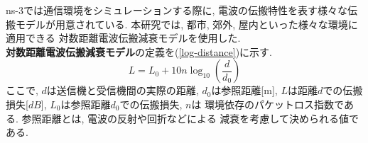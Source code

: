 \indent ns-3では通信環境をシミュレーションする際に, 
電波の伝搬特性を表す様々な伝搬モデルが用意されている. 
本研究では, 都市, 郊外, 屋内といった様々な環境に適用できる
対数距離電波伝搬減衰モデルを使用した.\\ 
\indent \textbf{対数距離電波伝搬減衰モデル}の定義を(\ref{log-distance})に示す. 
\begin{equation}\label{log-distance}
  L = L_0 + 10n\log_{10}\left(\frac{d}{d_0}\right)
\end{equation}
\noindent ここで, $d$は送信機と受信機間の実際の距離, $d_0$は参照距離[m], 
$L$は距離$d$での伝搬損失[$dB$], $L_0$は参照距離$d_0$での伝搬損失, $n$は
環境依存のパケットロス指数である. 参照距離とは, 電波の反射や回折などによる
減衰を考慮して決められる値である. \\